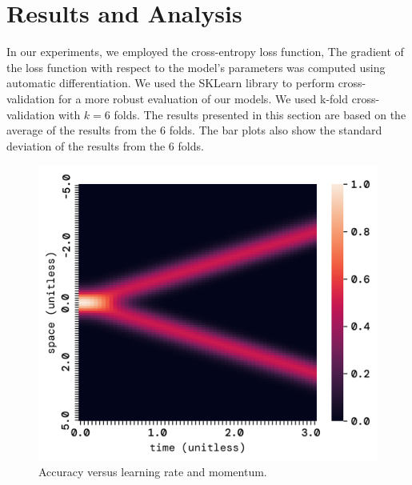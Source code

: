 \documentclass[twoside,11pt]{report}
\begin{document}
\section{Results and Analysis}
\label{sec:resultsdiscussion}

    In our experiments, we employed the cross-entropy loss function, The gradient of the loss function 
    with respect to the model's parameters was computed using automatic differentiation. 
    We used the SKLearn\cite{scikit-learn}
    library to perform cross-validation for a more robust evaluation of our models.
    We used k-fold cross-validation with $k=6$ folds. The results presented in this section are based on
    the average of the results from the 6 folds. The bar plots also show the standard deviation of the
    results from the 6 folds.

    \begin{figure}[!ht]
        \begin{minipage}[t]{0.5\textwidth - 1mm}
            \begin{center}
                \includegraphics[width=\textwidth]{../runsAndFigures/wave_finite.png}
            \end{center}
            \caption
            {
                Accuracy versus learning rate and momentum.
            }\label{fig:wave_finite}
        \end{minipage}
        \hspace{2mm}
        \begin{minipage}[t]{0.5\textwidth - 1mm}

\end{minipage}
\end{figure}
\end{document}
